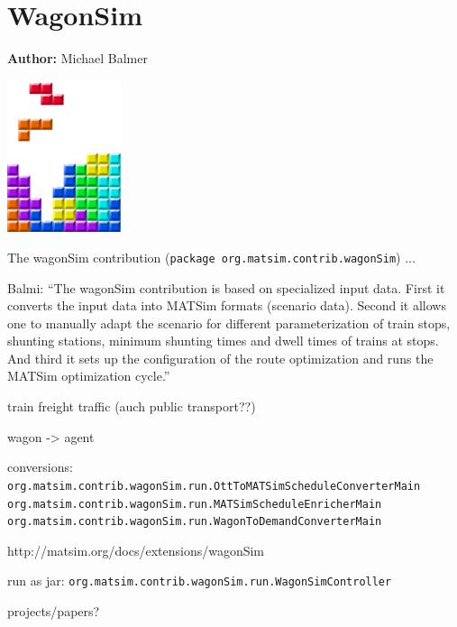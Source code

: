 \chapter{WagonSim }
\label{ch:wagonSim}

\hfill \textbf{Author:} Michael Balmer

\begin{center} \includegraphics[width=0.25\textwidth, angle=0]{figures/MATSimBook.png} \end{center}

The wagonSim contribution (\lstinline|package org.matsim.contrib.wagonSim|) ...

Balmi: ``The wagonSim contribution is based on specialized input data. First it converts the input data into MATSim formats (scenario data). Second it allows one to manually adapt the scenario for different parameterization of train stops, shunting stations, minimum shunting times and dwell times of trains at stops. And third it sets up the configuration of the route optimization and runs the MATSim optimization cycle.''

train freight traffic (auch public transport??)

wagon -> agent


conversions: \lstinline|org.matsim.contrib.wagonSim.run.OttToMATSimScheduleConverterMain|
\lstinline|org.matsim.contrib.wagonSim.run.MATSimScheduleEnricherMain|
\lstinline|org.matsim.contrib.wagonSim.run.WagonToDemandConverterMain|

http://matsim.org/docs/extensions/wagonSim

run as jar: \lstinline|org.matsim.contrib.wagonSim.run.WagonSimController|

projects/papers?

